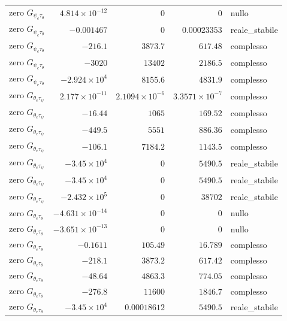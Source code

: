 \documentclass[10pt,a4paper]{article}
\numberwithin{equation}{section}
\begin{document}
\begin{longtable}{lrrrl}
zero $G_{\psi_e\tau_\theta}$ & $4.814\times10^{-12}$ & $0$ & $0$ & nullo \\
zero $G_{\psi_e\tau_\theta}$ & $-0.001467$ & $0$ & $0.00023353$ & reale\_stabile \\
zero $G_{\psi_e\tau_\theta}$ & $-216.1$ & $3873.7$ & $617.48$ & complesso \\
zero $G_{\psi_e\tau_\theta}$ & $-3020$ & $13402$ & $2186.5$ & complesso \\
zero $G_{\psi_e\tau_\theta}$ & $-2.924\times10^{4}$ & $8155.6$ & $4831.9$ & complesso \\
\midrule
zero $G_{\theta_e\tau_\psi}$ & $2.177\times10^{-11}$ & $2.1094\times10^{-6}$ & $3.3571\times10^{-7}$ & complesso \\
zero $G_{\theta_e\tau_\psi}$ & $-16.44$ & $1065$ & $169.52$ & complesso \\
zero $G_{\theta_e\tau_\psi}$ & $-449.5$ & $5551$ & $886.36$ & complesso \\
zero $G_{\theta_e\tau_\psi}$ & $-106.1$ & $7184.2$ & $1143.5$ & complesso \\
zero $G_{\theta_e\tau_\psi}$ & $-3.45\times10^{4}$ & $0$ & $5490.5$ & reale\_stabile \\
zero $G_{\theta_e\tau_\psi}$ & $-3.45\times10^{4}$ & $0$ & $5490.5$ & reale\_stabile \\
zero $G_{\theta_e\tau_\psi}$ & $-2.432\times10^{5}$ & $0$ & $38702$ & reale\_stabile \\
\midrule
zero $G_{\theta_e\tau_\theta}$ & $-4.631\times10^{-14}$ & $0$ & $0$ & nullo \\
zero $G_{\theta_e\tau_\theta}$ & $-3.651\times10^{-13}$ & $0$ & $0$ & nullo \\
zero $G_{\theta_e\tau_\theta}$ & $-0.1611$ & $105.49$ & $16.789$ & complesso \\
zero $G_{\theta_e\tau_\theta}$ & $-218.1$ & $3873.2$ & $617.42$ & complesso \\
zero $G_{\theta_e\tau_\theta}$ & $-48.64$ & $4863.3$ & $774.05$ & complesso \\
zero $G_{\theta_e\tau_\theta}$ & $-276.8$ & $11600$ & $1846.7$ & complesso \\
zero $G_{\theta_e\tau_\theta}$ & $-3.45\times10^{4}$ & $0.00018612$ & $5490.5$ & reale\_stabile \\
\bottomrule\end{longtable}
\end{document}
